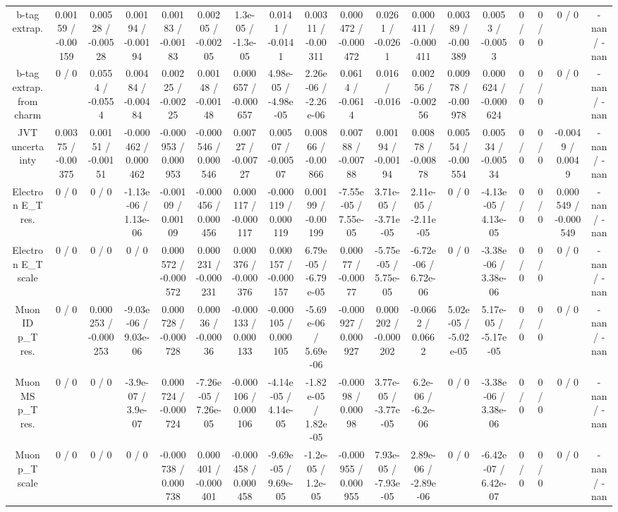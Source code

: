 \documentclass[10pt]{article}
\begin{document}
\begin{table}[htbp]
\begin{center}
\begin{tabular}{|c|c|c|c|c|c|c|c|c|c|c|c|c|c|c|c|c|c|}
  b-tag extrap. & 0.00159 / -0.00159 & 0.00528 / -0.00528 & 0.00194 / -0.00194 & 0.00183 / -0.00183 & 0.00205 / -0.00205 & 1.3e-05 / -1.3e-05 & 0.0141 / -0.0141 & 0.00311 / -0.00311 & 0.000472 / -0.000472 & 0.0261 / -0.0261 & 0.000411 / -0.000411 & 0.00389 / -0.00389 & 0.0053 / -0.0053 & 0 / 0 & 0 / 0 & 0 / 0 & -nan / -nan \\ 
  b-tag extrap. from charm & 0 / 0 & 0.0554 / -0.0554 & 0.00484 / -0.00484 & 0.00225 / -0.00225 & 0.00148 / -0.00148 & 0.000657 / -0.000657 & 4.98e-05 / -4.98e-05 & 2.26e-06 / -2.26e-06 & 0.0614 / -0.0614 & 0.016 / -0.016 & 0.00256 / -0.00256 & 0.00978 / -0.00978 & 0.000624 / -0.000624 & 0 / 0 & 0 / 0 & 0 / 0 & -nan / -nan \\ 
  JVT uncertainty & 0.00375 / -0.00375 & 0.00151 / -0.00151 & -0.000462 / 0.000462 & -0.000953 / 0.000953 & -0.000546 / 0.000546 & 0.00727 / -0.00727 & 0.00507 / -0.00507 & 0.00866 / -0.00866 & 0.00788 / -0.00788 & 0.00194 / -0.00194 & 0.00878 / -0.00878 & 0.00554 / -0.00554 & 0.00534 / -0.00534 & 0 / 0 & 0 / 0 & -0.0049 / 0.0049 & -nan / -nan \\ 
  Electron E_{T} res. & 0 / 0 & 0 / 0 & -1.13e-06 / 1.13e-06 & -0.00109 / 0.00109 & -0.000456 / 0.000456 & 0.000117 / -0.000117 & -0.000119 / 0.000119 & 0.00199 / -0.00199 & -7.55e-05 / 7.55e-05 & 3.71e-05 / -3.71e-05 & 2.11e-05 / -2.11e-05 & 0 / 0 & -4.13e-05 / 4.13e-05 & 0 / 0 & 0 / 0 & 0.000549 / -0.000549 & -nan / -nan \\ 
  Electron E_{T} scale & 0 / 0 & 0 / 0 & 0 / 0 & 0.000572 / -0.000572 & 0.000231 / -0.000231 & 0.000376 / -0.000376 & 0.000157 / -0.000157 & 6.79e-05 / -6.79e-05 & 0.00077 / -0.00077 & -5.75e-05 / 5.75e-05 & -6.72e-06 / 6.72e-06 & 0 / 0 & -3.38e-06 / 3.38e-06 & 0 / 0 & 0 / 0 & 0 / 0 & -nan / -nan \\ 
  Muon ID p_{T} res. & 0 / 0 & 0.000253 / -0.000253 & -9.03e-06 / 9.03e-06 & 0.000728 / -0.000728 & 0.00036 / -0.00036 & -0.000133 / 0.000133 & -0.000105 / 0.000105 & -5.69e-06 / 5.69e-06 & -0.000927 / 0.000927 & 0.000202 / -0.000202 & -0.0662 / 0.0662 & 5.02e-05 / -5.02e-05 & 5.17e-05 / -5.17e-05 & 0 / 0 & 0 / 0 & 0 / 0 & -nan / -nan \\ 
  Muon MS p_{T} res. & 0 / 0 & 0 / 0 & -3.9e-07 / 3.9e-07 & 0.000724 / -0.000724 & -7.26e-05 / 7.26e-05 & -0.000106 / 0.000106 & -4.14e-05 / 4.14e-05 & -1.82e-05 / 1.82e-05 & -0.00098 / 0.00098 & 3.77e-05 / -3.77e-05 & 6.2e-06 / -6.2e-06 & 0 / 0 & -3.38e-06 / 3.38e-06 & 0 / 0 & 0 / 0 & 0 / 0 & -nan / -nan \\ 
  Muon p_{T} scale & 0 / 0 & 0 / 0 & 0 / 0 & -0.000738 / 0.000738 & 0.000401 / -0.000401 & -0.000458 / 0.000458 & -9.69e-05 / 9.69e-05 & -1.2e-05 / 1.2e-05 & -0.000955 / 0.000955 & 7.93e-05 / -7.93e-05 & 2.89e-06 / -2.89e-06 & 0 / 0 & -6.42e-07 / 6.42e-07 & 0 / 0 & 0 / 0 & 0 / 0 & -nan / -nan \\ 

\end{tabular}
\end{center}
\end{table}
\end{document}
